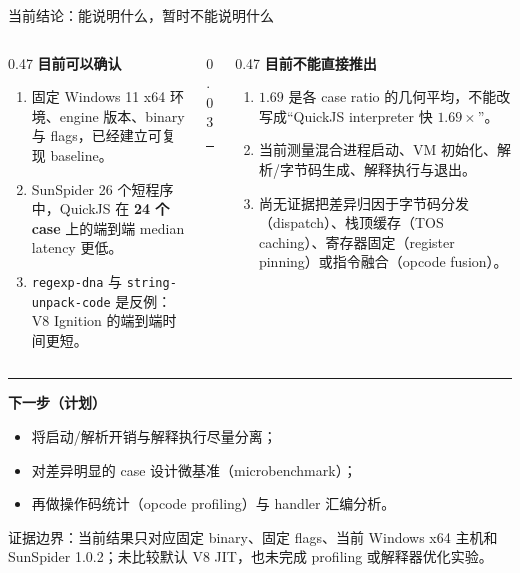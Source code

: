 \documentclass[aspectratio=169,10pt]{beamer}
\newcommand{\sourcenote}[1]{%
  {\color{NoteGray}\fontsize{6.7}{8}\selectfont #1}%
}
\newcommand{\code}[1]{\texttt{#1}}
\newcommand{\accent}[1]{\textcolor{DeepBlue}{\textbf{#1}}}
\begin{document}
\begin{frame}{当前结论：能说明什么，暂时不能说明什么}
\fontsize{8.8}{10.3}\selectfont

\begin{columns}[T,onlytextwidth]
\begin{column}{0.47\textwidth}
  {\normalsize\color{DeepBlue}\bfseries 目前可以确认}
  \vspace{0.06cm}
  \begin{enumerate}\setlength{\itemsep}{0.10em}\setlength{\parskip}{0pt}
    \item 固定 Windows 11 x64 环境、engine 版本、binary 与 flags，已经建立可复现 baseline。
    \item SunSpider 26 个短程序中，QuickJS 在 \accent{24 个 case} 上的端到端 median latency 更低。
    \item \code{regexp-dna} 与 \code{string-unpack-code} 是反例：V8 Ignition 的端到端时间更短。
  \end{enumerate}
\end{column}

\begin{column}{0.03\textwidth}
  \centering
  {\color{RuleGray}\rule{0.5pt}{3.55cm}}
\end{column}

\begin{column}{0.47\textwidth}
  {\normalsize\color{DeepBlue}\bfseries 目前不能直接推出}
  \vspace{0.06cm}
  \begin{enumerate}\setlength{\itemsep}{0.10em}\setlength{\parskip}{0pt}
    \item $1.69$ 是各 case ratio 的几何平均，不能改写成“QuickJS interpreter 快 $1.69\times$”。
    \item 当前测量混合进程启动、VM 初始化、解析/字节码生成、解释执行与退出。
    \item 尚无证据把差异归因于字节码分发（dispatch）、栈顶缓存（TOS caching）、寄存器固定（register pinning）或指令融合（opcode fusion）。
  \end{enumerate}
\end{column}
\end{columns}

\vspace{0.10cm}
{\color{RuleGray}\rule{\textwidth}{0.5pt}}
\vspace{0.06cm}

\textbf{下一步（计划）}
\begin{itemize}\setlength{\itemsep}{0.05em}\setlength{\parskip}{0pt}
  \item 将启动/解析开销与解释执行尽量分离；
  \item 对差异明显的 case 设计微基准（microbenchmark）；
  \item 再做操作码统计（opcode profiling）与 handler 汇编分析。
\end{itemize}

\vfill
\sourcenote{证据边界：当前结果只对应固定 binary、固定 flags、当前 Windows x64 主机和 SunSpider 1.0.2；未比较默认 V8 JIT，也未完成 profiling 或解释器优化实验。}
\end{frame}
\end{document}
